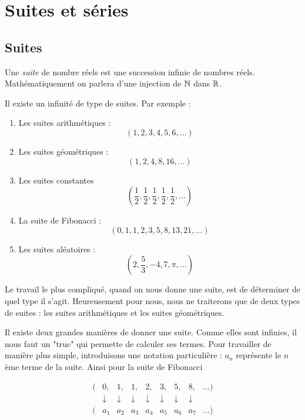 \chapter{Suites et séries}

\section{Suites}

\begin{definition}
Une \emph{suite} de nombre réels est une succession infinie de nombres réels. Mathématiquement on parlera d'une injection de $\mathbb{N}$ dans $\mathbb{R}$.
\end{definition}

\begin{exemple}
Il existe un infinité de type de suites. Par exemple :
\begin{enumerate}
\item Les suites arithmétiques : $$(1,2,3,4,5,6,\dots) $$\label{exemplearithmetique}
\item Les suites géométriques : $$(1,2,4,8,16,\dots) $$\label{exemplegeometrique}
\item Les suites constantes $$(\frac{1}{2},\frac{1}{2},\frac{1}{2},\frac{1}{2},\frac{1}{2},\dots) $$\label{exempleconstante}
\item La suite de Fibonacci : $$(0,1,1,2,3,5,8,13,21,\dots) $$\label{exemplefibonacci}
\item Les suites aléatoires : $$(2, \frac{5}{3}, -4, 7, \pi, \dots) $$\label{exemplealeatoire}
\end{enumerate}
Le travail le plus compliqué, quand on nous donne une suite, est de déterminer de quel type il s'agit. Heureusement pour nous, nous ne traiterons que de deux types de suites : les suites arithmétiques et les suites géométriques.
\end{exemple}

Il existe deux grandes manières de donner une suite. Comme elles sont infinies, il nous faut un "truc" qui permette de calculer ses termes. Pour travailler de manière plus simple, introduisons une notation particulière : $a_n$ représente le $n$ème terme de la suite. Ainsi pour la suite de Fibonacci

$$
\begin{array}{lllllllll}
(&0,& 1,&1,&2,&3,&5,&8,&\dots)\\
&\downarrow &\downarrow &\downarrow &\downarrow &\downarrow &\downarrow &\downarrow & \\
(& a_1 & a_2 & a_3 & a_4 & a_5 & a_6 & a_7 & \dots )\\
\end{array}
$$

